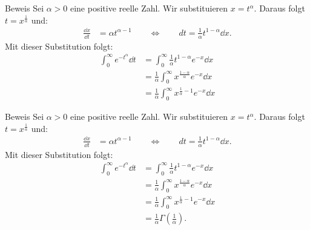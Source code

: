 \documentclass[10pt]{beamer}
\begin{document}
\begin{frame}{Beweis}
    Sei \( \alpha > 0 \) eine positive reelle Zahl. Wir substituieren \( x = t^{\alpha} \). Daraus folgt \( t = x^{\frac{1}{\alpha}} \) und:
    \begin{align*}
        \frac{\dd{x}}{\dd{t}}
        & = \alpha t^{\alpha - 1}
        \quad\quad \Leftrightarrow \quad\quad dt = \frac{1}{\alpha} t^{1 - \alpha} \dd{x}.
    \end{align*}
    Mit dieser Substitution folgt:
    \begin{align*}
        \int_{0}^{\infty} e^{-t^{\alpha}} \dd{t}
        & = \int_{0}^{\infty} \frac{1}{\alpha} t^{1 - \alpha} e^{-x} \dd{x} \\
        & = \frac{1}{\alpha} \int_{0}^{\infty} x^{\frac{1 - \alpha}{\alpha}} e^{-x} \dd{x} \\
        & = \frac{1}{\alpha} \int_{0}^{\infty} x^{\frac{1}{\alpha} - 1} e^{-x} \dd{x}
    \end{align*}
\end{frame}



\begin{frame}{Beweis}
    Sei \( \alpha > 0 \) eine positive reelle Zahl. Wir substituieren \( x = t^{\alpha} \). Daraus folgt \( t = x^{\frac{1}{\alpha}} \) und:
    \begin{align*}
        \frac{\dd{x}}{\dd{t}}
        & = \alpha t^{\alpha - 1}
        \quad\quad \Leftrightarrow \quad\quad dt = \frac{1}{\alpha} t^{1 - \alpha} \dd{x}.
    \end{align*}
    Mit dieser Substitution folgt:
    \begin{align*}
        \int_{0}^{\infty} e^{-t^{\alpha}} \dd{t}
        & = \int_{0}^{\infty} \frac{1}{\alpha} t^{1 - \alpha} e^{-x} \dd{x} \\
        & = \frac{1}{\alpha} \int_{0}^{\infty} x^{\frac{1 - \alpha}{\alpha}} e^{-x} \dd{x} \\
        & = \frac{1}{\alpha} \int_{0}^{\infty} x^{\frac{1}{\alpha} - 1} e^{-x} \dd{x} \\
        & = \frac{1}{\alpha} \Gamma\left( \frac{1}{\alpha} \right).
    \end{align*}
\end{frame}
\end{document}
